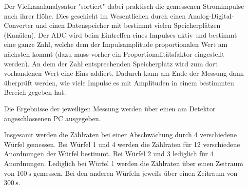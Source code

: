 Der Vielkanalanalysator "sortiert" dabei praktisch die gemessenen Stromimpulse nach ihrer Höhe.
Dies geschieht im Wesentlichen durch einen Analog-Digital-Converter und einen Datenspeicher mit bestimmt vielen
Speicherplätzen (Kanälen). Der ADC wird beim Eintreffen eines Impulses aktiv und bestimmt eine ganze Zahl, welche
dem der Impulsamplitude proportionalen Wert am nächsten kommt (dazu muss vorher ein Proportionalitätsfaktor eingestellt
werden). An dem der Zahl entsprechenden Speicherplatz wird zum dort vorhandenen Wert eine Eins addiert. Dadurch
kann am Ende der Messung dann überprüft werden, wie viele Impulse es mit Amplituden in einem bestimmten Bereich gegeben hat.

Die Ergebnisse der jeweiligen Messung werden über einen am Detektor angeschlossenen PC ausgegeben.

Insgesamt werden die Zählraten bei einer Abschwächung durch 4 verschiedene Würfel gemessen.
Bei Würfel 1 und 4 werden die Zählraten für 12 verschiedene Anordnungen der Würfel bestimmt.
Bei Würfel 2 und 3 lediglich für 4 Anordnungen. Lediglich bei Würfel 1 werden die Zählraten über einen
Zeitraum von $\SI{100}{\second}$ gemessen. Bei den anderen Würfeln jeweils über einen
Zeitraum von $\SI{300}{\second}$.
